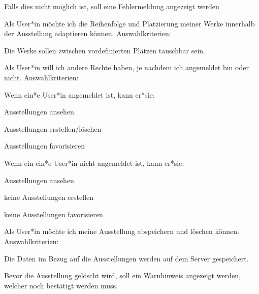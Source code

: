 \begin{compactenum}
    \begin{compactitem}
        \item Falls dies nicht möglich ist, soll eine Fehlermeldung angezeigt werden
    \end{compactitem} 
    \item Als User*in möchte ich die Reihenfolge und Platzierung meiner Werke innerhalb der Ausstellung adaptieren können. Auswahlkriterien: 
    \begin{compactitem}
        \item Die Werke sollen zwischen vordefinierten Plätzen tauschbar sein.
    \end{compactitem} 
    \item Als User*in will ich andere Rechte haben, je nachdem ich angemeldet bin oder nicht. Auswahlkriterien: 
    \begin{compactitem}
        \item Wenn ein*e User*in angemeldet ist, kann er*sie:
        \begin{compactitem}
            \item Ausstellungen ansehen 
            \item Ausstellungen erstellen/löschen 
            \item Ausstellungen favorisieren
        \end{compactitem}  
        \item Wenn ein ein*e User*in nicht angemeldet ist, kann er*sie: 
        \begin{compactitem}
            \item Ausstellungen ansehen 
            \item keine Ausstellungen erstellen 
            \item keine Ausstellungen favorisieren
        \end{compactitem} 
    \end{compactitem} 
    \item Als User*in möchte ich meine Ausstellung abspeichern und löschen können. Auswahlkriterien: 
    \begin{compactitem}
        \item Die Daten im Bezug auf die Ausstellungen werden auf dem Server gespeichert.
        \item Bevor die Ausstellung gelöscht wird, soll ein Warnhinweis angezeigt werden, welcher noch bestätigt werden muss. 
    \end{compactitem} 





\end{compactenum}

